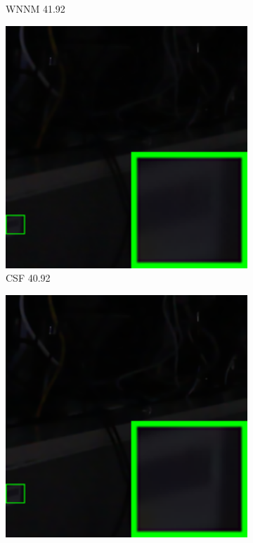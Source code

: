 \begin{figure}
\begin{subfigure}[t]{0.19\textwidth}
\caption{WNNM 41.92}
    \end{subfigure}
    \hfill
    \begin{subfigure}[t]{0.19\textwidth}
        \centering
        \includegraphics[width=1\textwidth]{images/guided/our/resize_br_CSF_SONY_A7II_ISO6400_DSC03017_part5.png}
\caption{CSF 40.92}
    \end{subfigure}
    \hfill
    \begin{subfigure}[t]{0.19\textwidth}
        \centering
        \includegraphics[width=1\textwidth]{images/guided/our/resize_br_TRD_SONY_A7II_ISO6400_DSC03017_part5.png}

\end{subfigure}
\end{figure}
